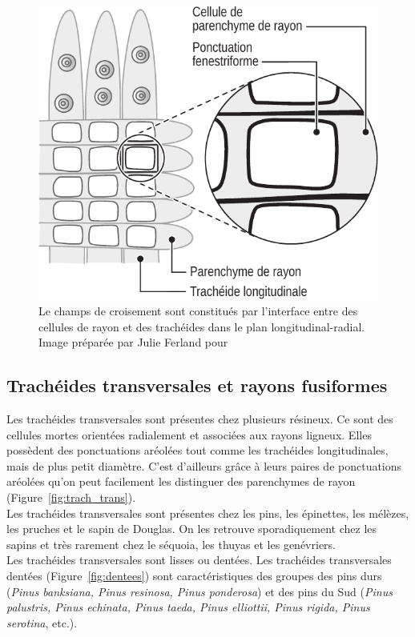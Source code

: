 \begin{figure}[h]
	\centering
	\includegraphics[scale=0.8]{img/ch3_croisement}
	\caption{Le champs de croisement sont constitués par l'interface entre des cellules de rayon et des trachéides dans le plan longitudinal-radial. Image préparée par Julie Ferland pour \cite{achim2010dendroecologie}}
	\label{fig:croisement}
\end{figure}

\subsection{Trachéides transversales et rayons fusiformes}

Les trachéides transversales sont présentes chez plusieurs résineux. Ce sont des cellules mortes orientées radialement et associées aux rayons ligneux. Elles possèdent des ponctuations aréolées tout comme les trachéides longitudinales, mais de plus petit diamètre. C'est d'ailleurs grâce à leurs paires de ponctuations aréolées qu'on peut facilement les distinguer des parenchymes de rayon (Figure~\ref{fig:trach_trans}).\\

Les trachéides transversales sont présentes chez les pins, les épinettes, les mélèzes, les pruches et le sapin de Douglas. On les retrouve sporadiquement chez les sapins et très rarement chez le séquoia, les thuyas et les genévriers.\\

Les trachéides transversales sont lisses ou dentées. Les trachéides transversales dentées (Figure~\ref{fig:dentees}) sont caractéristiques des groupes des pins durs (\textit{Pinus banksiana, Pinus resinosa, Pinus ponderosa}) et des pins du Sud (\textit{Pinus palustris, Pinus echinata, Pinus taeda, Pinus elliottii, Pinus rigida, Pinus serotina}, etc.).\\


